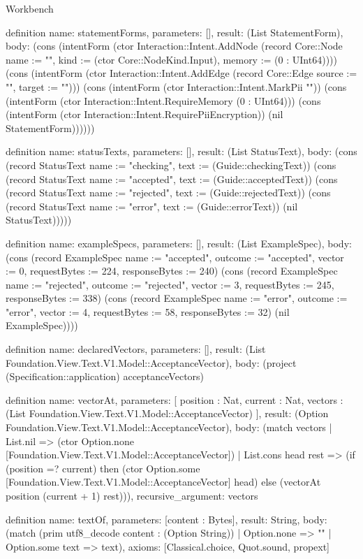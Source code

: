 \begin{lexlean}{Workbench}
\begin{semanticmodule}
definition{
  name: statementForms,
  parameters: [],
  result: (List StatementForm),
  body: (cons (intentForm (ctor Interaction::Intent.AddNode (record Core::Node {name := "", kind := (ctor Core::NodeKind.Input), memory := (0 : UInt64)}))) (cons (intentForm (ctor Interaction::Intent.AddEdge (record Core::Edge {source := "", target := ""}))) (cons (intentForm (ctor Interaction::Intent.MarkPii "")) (cons (intentForm (ctor Interaction::Intent.RequireMemory (0 : UInt64))) (cons (intentForm (ctor Interaction::Intent.RequirePiiEncryption)) (nil StatementForm))))))
}

definition{
  name: statusTexts,
  parameters: [],
  result: (List StatusText),
  body: (cons (record StatusText {name := "checking", text := (Guide::checkingText)}) (cons (record StatusText {name := "accepted", text := (Guide::acceptedText)}) (cons (record StatusText {name := "rejected", text := (Guide::rejectedText)}) (cons (record StatusText {name := "error", text := (Guide::errorText)}) (nil StatusText)))))
}

definition{
  name: exampleSpecs,
  parameters: [],
  result: (List ExampleSpec),
  body: (cons (record ExampleSpec {name := "accepted", outcome := "accepted", vector := 0, requestBytes := 224, responseBytes := 240}) (cons (record ExampleSpec {name := "rejected", outcome := "rejected", vector := 3, requestBytes := 245, responseBytes := 338}) (cons (record ExampleSpec {name := "error", outcome := "error", vector := 4, requestBytes := 58, responseBytes := 32}) (nil ExampleSpec))))
}

definition{
  name: declaredVectors,
  parameters: [],
  result: (List Foundation.View.Text.V1.Model::AcceptanceVector),
  body: (project (Specification::application) acceptanceVectors)
}

definition{
  name: vectorAt,
  parameters: [
    position : Nat,
    current : Nat,
    vectors : (List Foundation.View.Text.V1.Model::AcceptanceVector)
  ],
  result: (Option Foundation.View.Text.V1.Model::AcceptanceVector),
  body: (match vectors
    | List.nil => (ctor Option.none [Foundation.View.Text.V1.Model::AcceptanceVector])
    | List.cons head rest => (if (position =? current) then (ctor Option.some [Foundation.View.Text.V1.Model::AcceptanceVector] head) else (vectorAt position (current + 1) rest))),
  recursive_argument: vectors
}

definition{
  name: textOf,
  parameters: [content : Bytes],
  result: String,
  body: (match (prim utf8_decode content : (Option String))
    | Option.none => ""
    | Option.some text => text),
  axioms: [Classical.choice, Quot.sound, propext]
}


\end{semanticmodule}
\end{lexlean}
